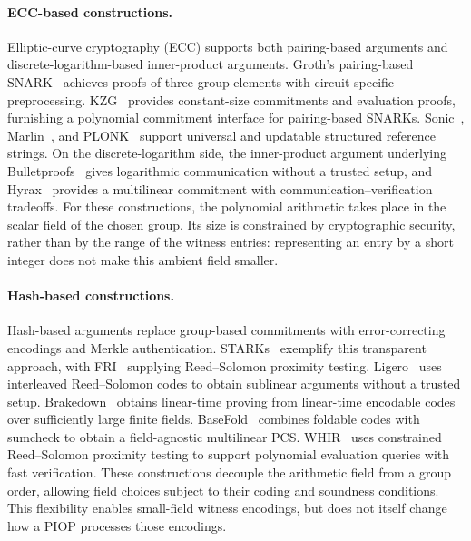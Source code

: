 \paragraph{ECC-based constructions.}
Elliptic-curve cryptography (ECC) supports both pairing-based arguments
and discrete-logarithm-based inner-product arguments.
Groth's pairing-based SNARK~\cite{eurocrypt/Groth16} achieves proofs
of three group elements with circuit-specific preprocessing.
KZG~\cite{asiacrypt/KateZG10} provides constant-size commitments and
evaluation proofs, furnishing a polynomial commitment interface for
pairing-based SNARKs.
Sonic~\cite{ccs/MallerBKM19}, Marlin~\cite{eurocrypt/ChiesaHMMVW20},
and PLONK~\cite{iacr/GabizonWC19} support universal and updatable
structured reference strings.
On the discrete-logarithm side, the inner-product argument underlying
Bulletproofs~\cite{sp/BunzBBPWM18} gives logarithmic communication
without a trusted setup, and Hyrax~\cite{sp/WahbyTSTW18} provides
a multilinear commitment with communication--verification tradeoffs.
For these constructions, the polynomial arithmetic takes place in
the scalar field of the chosen group.
Its size is constrained by cryptographic security, rather than by
the range of the witness entries: representing an entry by a short
integer does not make this ambient field smaller.

\paragraph{Hash-based constructions.}
Hash-based arguments replace group-based commitments with
error-correcting encodings and Merkle authentication.
STARKs~\cite{iacr/Ben-SassonBHR18} exemplify this transparent approach,
with FRI~\cite{icalp/Ben-SassonBHR18} supplying Reed--Solomon
proximity testing.
Ligero~\cite{dcc/AmesHIV23} uses interleaved Reed--Solomon codes
to obtain sublinear arguments without a trusted setup.
Brakedown~\cite{crypto/GolovnevLSTW23} obtains linear-time proving
from linear-time encodable codes over sufficiently large finite fields.
BaseFold~\cite{crypto/ZeilbergerCF24} combines foldable codes with
sumcheck to obtain a field-agnostic multilinear PCS.
WHIR~\cite{eurocrypt/ArnonCFY25} uses constrained Reed--Solomon
proximity testing to support polynomial evaluation queries with
fast verification.
These constructions decouple the arithmetic field from a group order,
allowing field choices subject to their coding and soundness conditions.
This flexibility enables small-field witness encodings, but does not
itself change how a PIOP processes those encodings.

